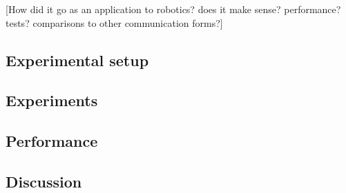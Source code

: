 [How did it go as an application to robotics? does it make sense? performance? tests? comparisons to other communication forms?]

\subsection{Experimental setup}


\subsection{Experiments}

\subsection{Performance}

\subsection{Discussion}